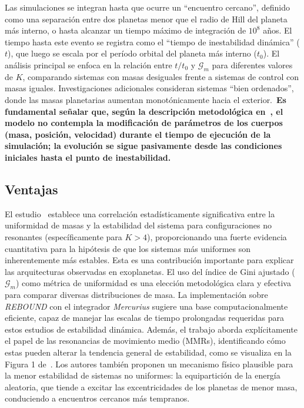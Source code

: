 Las simulaciones se integran hasta que ocurre un ``encuentro cercano'', definido como una separación entre dos planetas menor que el radio de Hill del planeta más interno, o hasta alcanzar un tiempo máximo de integración de $10^8$ años. El tiempo hasta este evento se registra como el ``tiempo de inestabilidad dinámica'' ($t$), que luego se escala por el período orbital del planeta más interno ($t_0$). El análisis principal se enfoca en la relación entre $t/t_0$ y $\mathcal{G}_m$ para diferentes valores de $K$, comparando sistemas con masas desiguales frente a sistemas de control con masas iguales. Investigaciones adicionales consideran sistemas ``bien ordenados'', donde las masas planetarias aumentan monotónicamente hacia el exterior.\ \textbf{Es fundamental señalar que, según la descripción metodológica en~\cite{Wu2025}, el modelo no contempla la modificación de parámetros de los cuerpos (masa, posición, velocidad) durante el tiempo de ejecución de la simulación; la evolución se sigue pasivamente desde las condiciones iniciales hasta el punto de inestabilidad.}

\subsection[Ventajas]{Ventajas}
El estudio~\cite{Wu2025} establece una correlación estadísticamente significativa entre la uniformidad de masas y la estabilidad del sistema para configuraciones no resonantes (específicamente para $K > 4$), proporcionando una fuerte evidencia cuantitativa para la hipótesis de que los sistemas más uniformes son inherentemente más estables. Esta es una contribución importante para explicar las arquitecturas observadas en exoplanetas. El uso del índice de Gini ajustado ($\mathcal{G}_m$) como métrica de uniformidad es una elección metodológica clara y efectiva para comparar diversas distribuciones de masa. La implementación sobre \textit{REBOUND} con el integrador \textit{Mercurius} sugiere una base computacionalmente eficiente, capaz de manejar las escalas de tiempo prolongadas requeridas para estos estudios de estabilidad dinámica. Además, el trabajo aborda explícitamente el papel de las resonancias de movimiento medio (MMRs), identificando cómo estas pueden alterar la tendencia general de estabilidad, como se visualiza en la Figura 1 de~\cite{Wu2025}. Los autores también proponen un mecanismo físico plausible para la menor estabilidad de sistemas no uniformes: la equipartición de la energía aleatoria, que tiende a excitar las excentricidades de los planetas de menor masa, conduciendo a encuentros cercanos más tempranos.

